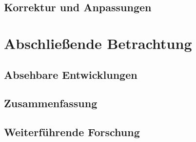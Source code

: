 \documentclass[11pt]{article}
\begin{document}
\subsection{Korrektur und Anpassungen}
\section{Abschließende Betrachtung}
\subsection{Absehbare Entwicklungen}
\subsection{Zusammenfassung}
\subsection{Weiterführende Forschung}
\newpage
\printbibliography%
\end{document}

